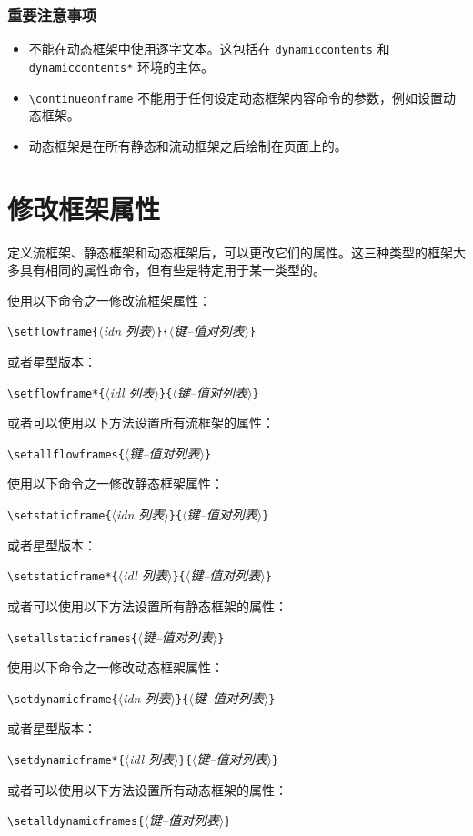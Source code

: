 \documentclass[a4paper]{book}%
\newcommand{\meta}[1]{\textnormal{\ensuremath{\langle}\makebox[0pt][l]{}\emph{#1}\makebox[0pt][l]{}\ensuremath{\rangle}}}
\newcommand{\cmd}[1]{\texttt{#1}}
\begin{document}
\subsection{重要注意事项}%
\begin{itemize}
    \item 不能在动态框架中使用逐字文本。这包括在 \cmd{dynamiccontents} 和 \cmd{dynamiccontents*} 环境的主体。
    \item \verb|\continueonframe| 不能用于任何设定动态框架内容命令的参数，例如设置动态框架。
    \item 动态框架是在所有静态和流动框架之后绘制在页面上的。
\end{itemize}
\chapter{修改框架属性}\label{chap-3}%
定义流框架、静态框架和动态框架后，可以更改它们的属性。这三种类型的框架大多具有相同的属性命令，但有些是特定用于某一类型的。

使用以下命令之一修改流框架属性：
\begin{mdframed}
\verb|\setflowframe{|\meta{idn 列表}\verb|}{|\meta{键{--}值对列表}\verb|}|
\end{mdframed}
或者星型版本：
\begin{mdframed}
\verb|\setflowframe*{|\meta{idl 列表}\verb|}{|\meta{键{--}值对列表}\verb|}|
\end{mdframed}
或者可以使用以下方法设置所有流框架的属性：
\begin{mdframed}
\verb|\setallflowframes{|\meta{键{--}值对列表}\verb|}|
\end{mdframed}
使用以下命令之一修改静态框架属性：
\begin{mdframed}
\verb|\setstaticframe{|\meta{idn 列表}\verb|}{|\meta{键{--}值对列表}\verb|}|
\end{mdframed}
或者星型版本：
\begin{mdframed}
\verb|\setstaticframe*{|\meta{idl 列表}\verb|}{|\meta{键{--}值对列表}\verb|}|
\end{mdframed}
或者可以使用以下方法设置所有静态框架的属性：
\begin{mdframed}
\verb|\setallstaticframes{|\meta{键{--}值对列表}\verb|}|
\end{mdframed}
使用以下命令之一修改动态框架属性：
\begin{mdframed}
\verb|\setdynamicframe{|\meta{idn 列表}\verb|}{|\meta{键{--}值对列表}\verb|}|
\end{mdframed}
或者星型版本：
\begin{mdframed}
\verb|\setdynamicframe*{|\meta{idl 列表}\verb|}{|\meta{键{--}值对列表}\verb|}|
\end{mdframed}
或者可以使用以下方法设置所有动态框架的属性：
\begin{mdframed}
\verb|\setalldynamicframes{|\meta{键{--}值对列表}\verb|}|
\end{mdframed}
\end{document}
